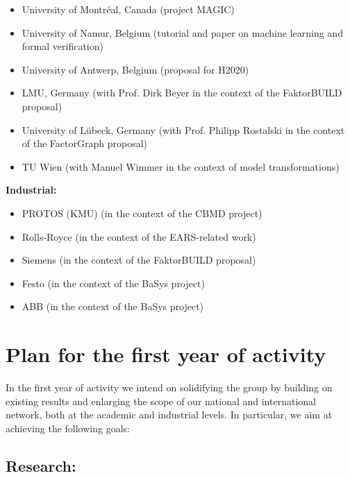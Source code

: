 \documentclass{article}
\begin{document}
\begin{appendices}
\begin{itemize}
  \item University of Montr\'eal, Canada (project MAGIC)
  \item University of Namur, Belgium (tutorial and paper on machine learning and
  formal verification)
  \item University of Antwerp, Belgium (proposal for H2020)
  \item LMU, Germany (with Prof. Dirk Beyer in the context of the FaktorBUILD
  proposal)
  \item University of L\"ubeck, Germany (with Prof. Philipp Rostalski in the
  context of the FactorGraph proposal)
  \item TU Wien (with Manuel Wimmer in the context of model transformations)\\
\end{itemize}
\textbf{Industrial:}

\begin{itemize}
  \item PROTOS (KMU) (in the context of the CBMD project)
  \item Rolls-Royce (in the context of the EARS-related work)
  \item Siemens (in the context of the FaktorBUILD proposal)
  \item Festo (in the context of the BaSys project)
  \item ABB (in the context of the BaSys project)
\end{itemize}

\section{Plan for the first year of activity}

In the first year of activity we intend on solidifying the group by building on
existing results and enlarging the scope of our national and international
network, both at the academic and industrial levels. In particular, we aim at
achieving the following goals:

\subsection{Research:}


\end{appendices}
\end{document}
